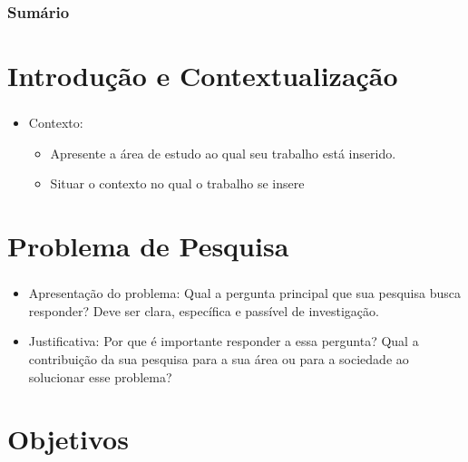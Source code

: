 \documentclass[aspectratio=169]{beamer}
\author{Nome do autor}
\begin{document}
	
\frame{
	\titlepage    
}
	
\begin{frame}[fragile]
	\frametitle{Sumário}
	\begin{multicols}{2}
		\centering
		\tableofcontents
	\end{multicols}
\end{frame}
	
\section{Introdução e Contextualização}
	
\begin{frame}[fragile]
	\frametitle{\secname}
	\begin{itemize}
		\item Contexto: 
		\begin{itemize}
			\item Apresente a área de estudo ao qual seu trabalho está inserido.
			\item Situar o contexto no qual o trabalho se insere
		\end{itemize}
	\end{itemize}
\end{frame}


\section{Problema de Pesquisa }

\begin{frame}[fragile]
	\frametitle{\secname}
	\begin{itemize}
		\item Apresentação do problema: Qual a pergunta principal que sua pesquisa busca responder? Deve ser clara, específica e passível de investigação.
		\item Justificativa: Por que é importante responder a essa pergunta? Qual a contribuição da sua pesquisa para a sua área ou para a sociedade ao solucionar esse problema?
	\end{itemize}
\end{frame}


\section{Objetivos}
\end{document}
